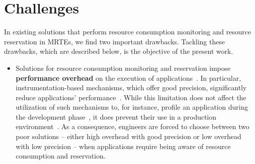\section{Challenges} \label{sec:intro-challenges}

In existing solutions that perform resource consumption monitoring and resource reservation in MRTEs, we find two important drawbacks.
Tackling these drawbacks, which are described below, is the objective of the present work.

\begin{itemize}
\item Solutions for resource consumption monitoring and reservation impose \textbf{performance overhead} on the execution of applications~\cite{Binder:2006:FEM:1173706.1173733,Marek:2012:DEL:2162037.2162046,Reiss:2008:CDP:1383559.1383566,Maurel:2012:AME:2304736.2304763}.
In particular, instrumentation-based mechanisms, which offer good precision, significantly reduce applications' performance~\cite{Dmitriev:2004:PJA:974043.974067,czajkowski_jres:_1998,Binder:2009:PPV:1464245.1464249}.
While this limitation does not affect the utilization of such mechanisms to, for instance, profile an application during the development phase~\cite{czajkowski_jres:_1998,binder_extending_2005,binder_portable_2001,Maebe06javana:a,Moret:2011:PBI:1960275.1960292, Hulaas:2008:PTL}, it does prevent their use in a production environment~\cite{Dmitriev:2004:PJA:974043.974067}.
As a consequence, engineers are forced to choose between two poor solutions -- either high overhead with good precision or low overhead with low precision -- when applications require being aware of resource consumption and reservation. 


\end{itemize}
